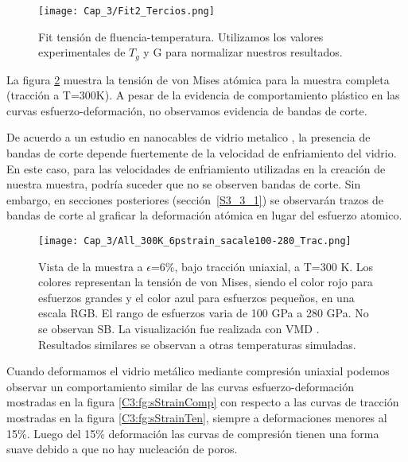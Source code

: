 \begin{figure}[htp]
\centering
\texttt{[image: Cap\_3/Fit2\_Tercios.png]}
\caption[Fit tensión de fluencia-temperatura.]{Fit tensión de fluencia-temperatura. Utilizamos los valores experimentales de $T_g$ y G \citep{johnson05} para normalizar nuestros resultados.}
\label{C3:fg:fitDosTercios}
\end{figure}

La figura \ref{C3:fg:sampleTen} muestra la tensión de von Mises atómica para la muestra completa (tracción a T=300K). A pesar de la evidencia de comportamiento plástico en las curvas esfuerzo-deformación, no observamos evidencia de bandas de corte.


De acuerdo a un estudio en nanocables de vidrio metalico \citep{xiao12}, la presencia de bandas de corte depende fuertemente de la velocidad de enfriamiento del vidrio. En este caso, para las velocidades de enfriamiento utilizadas en la creación de nuestra muestra, podría suceder que no se observen bandas de corte. Sin embargo, en secciones posteriores (sección~\ref{S3_3_1}) se observarán trazos de bandas de corte al graficar la deformación atómica en lugar del esfuerzo atomico.


\begin{figure}[htp]
\centering
\texttt{[image: Cap\_3/All\_300K\_6pstrain\_sacale100-280\_Trac.png]}
\caption[Vista de la muestra a $\epsilon$=6\%, bajo tracción uniaxial, a T=300 K.]{Vista de la muestra a $\epsilon$=6\%, bajo tracción uniaxial, a T=300 K. Los colores representan la tensión de von Mises, siendo el color rojo para esfuerzos grandes y el color azul para esfuerzos pequeños, en una escala RGB. El rango de esfuerzos varia de 100 GPa a 280 GPa. No se observan SB. La visualización fue realizada con VMD \citep{humphrey96}. Resultados similares se observan a otras temperaturas simuladas.}
\label{C3:fg:sampleTen}
\end{figure}

Cuando deformamos el vidrio metálico mediante compresión uniaxial podemos observar un comportamiento similar de las curvas esfuerzo-deformación mostradas en la figura \ref{C3:fg:sStrainComp} con respecto a las curvas de tracción mostradas en la figura \ref{C3:fg:sStrainTen}, siempre a deformaciones menores al 15\%. Luego del 15\% deformación las curvas de compresión tienen una forma suave debido a que no hay nucleación de poros.

